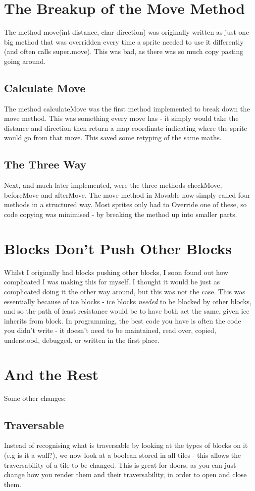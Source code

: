 \documentclass{article}
\begin{document}
\section{The Breakup of the Move Method}
The method move(int distance, char direction) was originally written as just one big method that was overridden every time a sprite needed to use it differently (and often calls super.move). This was bad, as there was so much copy pasting going around.
\subsection{Calculate Move}
The method calculateMove was the first method implemented to break down the move method. This was something every move has - it simply would take the distance and direction then return a map coordinate indicating where the sprite would go from that move. This saved some retyping of the same maths.
\subsection{The Three Way}
Next, and much later implemented, were the three methods checkMove, beforeMove and afterMove. The move method in Movable now simply called four methods in a structured way. Most sprites only had to Override one of these, so code copying was minimised - by breaking the method up into smaller parts.

\section{Blocks Don't Push Other Blocks}
Whilst I originally had blocks pushing other blocks, I soon found out how complicated I was making this for myself. I thought it would be just as complicated doing it the other way around, but this was not the case. This was essentially because of ice blocks - ice blocks \textit{needed} to be blocked by other blocks, and so the path of least resistance would be to have both act the same, given ice inherits from block. In programming, the best code you have is often the code you didn't write - it doesn't need to be maintained, read over, copied, understood, debugged, or written in the first place.

\section{And the Rest}
Some other changes:
\subsection{Traversable}
Instead of recognising what is traversable by looking at the types of blocks on it (e.g is it a wall?), we now look at a boolean stored in all tiles - this allows the traversability of a tile to be changed. This is great for doors, as you can just change how you render them and their traversability, in order to open and close them.
\end{document}
